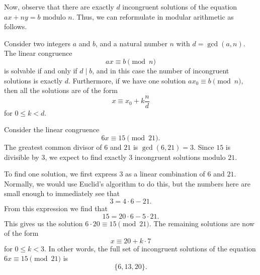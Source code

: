 Now, observe that there are exactly $d$ incongruent solutions of the equation $ax+ny=b$ modulo $n$. Thus, we can reformulate  in modular arithmetic as follows.

\begin{theorem}\label{theorem:linear-congruence-one-variable}
  Consider two integers $a$ and $b$, and a natural number $n$ with $d=\gcd(a,n)$. The linear congruence
  \begin{equation*}
    ax\equiv b\pmod{n}
  \end{equation*}
  is solvable if and only if $d\mid b$, and in this case the number of incongruent solutions is exactly $d$. Furthermore, if we have one solution $ax_0\equiv b\pmod{n}$, then all the solutions are of the form
  \begin{equation*}
    x \equiv x_0 + k\frac{n}{d}
  \end{equation*}
  for $0\leq k < d$.
\end{theorem}

\begin{example}
  Consider the linear congruence
  \begin{equation*}
    6x \equiv 15 \pmod{21}.
  \end{equation*}
  The greatest common divisor of $6$ and $21$ is $\gcd(6,21)=3$. Since $15$ is divisible by $3$, we expect to find exactly $3$ incongruent solutions modulo $21$.

  To find one solution, we first express $3$ as a linear combination of $6$ and $21$. Normally, we would use Euclid's algorithm to do this, but the numbers here are small enough to immediately see that
  \begin{equation*}
    3 = 4\cdot 6 - 21.
  \end{equation*}
  From this expression we find that
  \begin{equation*}
    15 = 20\cdot 6 - 5\cdot 21.
  \end{equation*}
  This gives us the solution $6\cdot 20\equiv 15\pmod{21}$. The remaining solutions are now of the form
  \begin{equation*}
    x\equiv 20 + k\cdot 7
  \end{equation*}
  for $0\leq k < 3$. In other words, the full set of incongruent solutions of the equation $6x\equiv 15\pmod{21}$ is
  \begin{equation*}
    \{6,13,20\}.
  \end{equation*}
\end{example}

